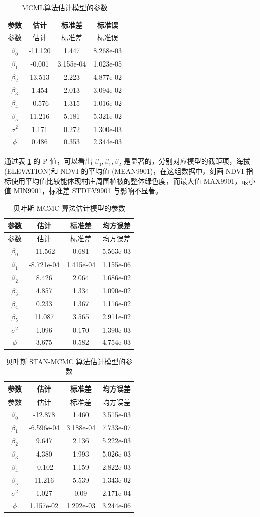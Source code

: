 \documentclass[12pt,a4paper,UTF8,twoside]{book}
\theoremstyle{definition}
\theoremstyle{definition}
\theoremstyle{definition}
\theoremstyle{remark}
\begin{document}
\begin{longtable}[]{@{}cccc@{}}
\caption{\label{tab:loaloa-estimation1}
MCML算法估计模型的参数}\tabularnewline
\toprule
参数 & 估计 & 标准差 & 标准误\tabularnewline
\midrule
\endfirsthead
\toprule
参数 & 估计 & 标准差 & 标准误\tabularnewline
\midrule
\endhead
\(\beta_{0}\) & -11.120 & 1.447 & 8.268e-03\tabularnewline
\(\beta_{1}\) & -0.001 & 3.155e-04 & 1.023e-05\tabularnewline
\(\beta_{2}\) & 13.513 & 2.223 & 4.877e-02\tabularnewline
\(\beta_{3}\) & 1.454 & 2.013 & 3.094e-02\tabularnewline
\(\beta_{4}\) & -0.576 & 1.315 & 1.016e-02\tabularnewline
\(\beta_{5}\) & 11.216 & 5.181 & 5.321e-02\tabularnewline
\(\sigma^2\) & 1.171 & 0.272 & 1.300e-03\tabularnewline
\(\phi\) & 0.486 & 0.353 & 2.344e-03\tabularnewline
\bottomrule
\end{longtable}

通过表 \ref{tab:loaloa-estimation1} 的 P 值，可以看出
\(\beta_{0},\beta_{1},\beta_{2}\) 是显著的，分别对应模型的截距项，海拔
(ELEVATION)和 NDVI 的平均值 (MEAN9901)，在这组数据中，刻画 NDVI
指标使用平均值比较能体现村庄周围植被的整体绿色度，而最大值
MAX9901，最小值 MIN9901，标准差 STDEV9901 与影响不显著。

\begin{longtable}[]{@{}cccc@{}}
\caption{\label{tab:loaloa-estimation2} 贝叶斯 MCMC
算法估计模型的参数}\tabularnewline
\toprule
参数 & 估计 & 标准差 & 均方误差\tabularnewline
\midrule
\endfirsthead
\toprule
参数 & 估计 & 标准差 & 均方误差\tabularnewline
\midrule
\endhead
\(\beta_{0}\) & -11.562 & 0.681 & 5.563e-03\tabularnewline
\(\beta_{1}\) & -8.721e-04 & 1.415e-04 & 1.155e-06\tabularnewline
\(\beta_{2}\) & 8.426 & 2.064 & 1.686e-02\tabularnewline
\(\beta_{3}\) & 4.857 & 1.334 & 1.090e-02\tabularnewline
\(\beta_{4}\) & 0.233 & 1.367 & 1.116e-02\tabularnewline
\(\beta_{5}\) & 11.087 & 3.565 & 2.911e-02\tabularnewline
\(\sigma^2\) & 1.096 & 0.170 & 1.390e-03\tabularnewline
\(\phi\) & 3.675 & 0.582 & 4.754e-03\tabularnewline
\bottomrule
\end{longtable}

\begin{longtable}[]{@{}cccc@{}}
\caption{\label{tab:loaloa-estimation3} 贝叶斯 STAN-MCMC
算法估计模型的参数}\tabularnewline
\toprule
参数 & 估计 & 标准差 & 均方误差\tabularnewline
\midrule
\endfirsthead
\toprule
参数 & 估计 & 标准差 & 均方误差\tabularnewline
\midrule
\endhead
\(\beta_{0}\) & -12.878 & 1.460 & 3.515e-03\tabularnewline
\(\beta_{1}\) & -6.596e-04 & 3.188e-04 & 7.733e-07\tabularnewline
\(\beta_{2}\) & 9.647 & 2.136 & 5.222e-03\tabularnewline
\(\beta_{3}\) & 4.380 & 1.993 & 5.026e-03\tabularnewline
\(\beta_{4}\) & -0.102 & 1.159 & 2.822e-03\tabularnewline
\(\beta_{5}\) & 11.216 & 5.539 & 1.343e-02\tabularnewline
\(\sigma^2\) & 1.027 & 0.09 & 2.171e-04\tabularnewline
\(\phi\) & 1.157e-02 & 1.292e-03 & 3.244e-06\tabularnewline
\bottomrule
\end{longtable}
\end{document}
